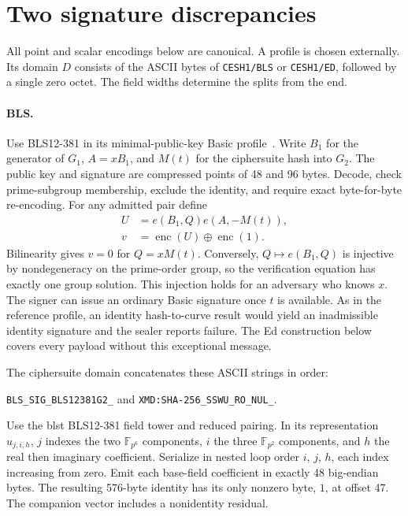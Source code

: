 \documentclass[10pt,twocolumn,letterpaper]{article}
\newcommand{\enc}{\operatorname{enc}}
\begin{document}
\section{Two signature discrepancies}
All point and scalar encodings below are canonical. A profile is chosen externally. Its domain $D$ consists of the ASCII bytes of \texttt{CESH1/BLS} or \texttt{CESH1/ED}, followed by a single zero octet. The field widths determine the splits from the end.

\paragraph{BLS.}
Use BLS12-381 in its minimal-public-key Basic profile~\cite{bls,blsdraft,curve}. Write $B_1$ for the generator of $G_1$, $A=xB_1$, and $M(t)$ for the ciphersuite hash into $G_2$. The public key and signature are compressed points of 48 and 96 bytes. Decode, check prime-subgroup membership, exclude the identity, and require exact byte-for-byte re-encoding. For any admitted pair define
\begin{align*}
 U &= e(B_1,Q)e(A,-M(t)),\\
 v &= \enc(U)\mathbin\oplus\enc(1).
\end{align*}
Bilinearity gives $v=0$ for $Q=xM(t)$. Conversely, $Q\mapsto e(B_1,Q)$ is injective by nondegeneracy on the prime-order group, so the verification equation has exactly one group solution. This injection holds for an adversary who knows $x$. The signer can issue an ordinary Basic signature once $t$ is available. As in the reference profile, an identity hash-to-curve result would yield an inadmissible identity signature and the sealer reports failure. The Ed construction below covers every payload without this exceptional message.

The ciphersuite domain concatenates these ASCII strings in order:
\begin{flushleft}\small
\texttt{BLS\_SIG\_BLS12381G2\_} and
\texttt{XMD:SHA-256\_SSWU\_RO\_NUL\_}.
\end{flushleft}
Use the blst BLS12-381 field tower and reduced pairing. In its representation $u_{j,i,h}$, $j$ indexes the two $\mathbb F_{p^6}$ components, $i$ the three $\mathbb F_{p^2}$ components, and $h$ the real then imaginary coefficient. Serialize in nested loop order $i$, $j$, $h$, each index increasing from zero. Emit each base-field coefficient in exactly 48 big-endian bytes. The resulting 576-byte identity has its only nonzero byte, $1$, at offset 47. The companion vector includes a nonidentity residual.
\end{document}
